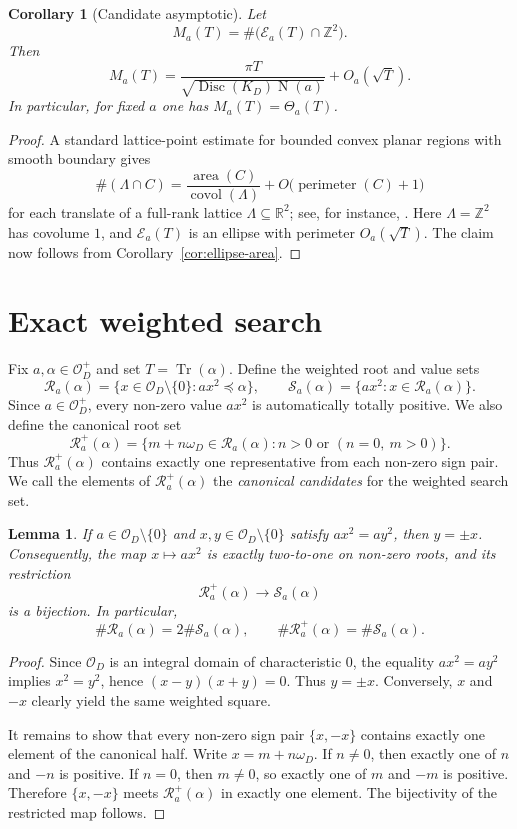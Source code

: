 \documentclass[manuscript]{acmart}
\theoremstyle{plain}
\newtheorem{lemma}[theorem]{Lemma}
\newtheorem{corollary}[theorem]{Corollary}
\theoremstyle{definition}
\theoremstyle{nonitalicremark}
\newcommand{\R}{\mathbb{R}}
\newcommand{\Z}{\mathbb{Z}}
\newcommand{\OO}{\mathcal{O}}
\newcommand{\OD}{\OO_D}
\newcommand{\Tr}{\operatorname{Tr}}
\newcommand{\N}{\operatorname{N}}
\newcommand{\Disc}{\operatorname{Disc}}
\newcommand{\covol}{\operatorname{covol}}
\newcommand{\cE}{\mathcal{E}}
\newcommand{\cR}{\mathcal{R}}
\newcommand{\cS}{\mathcal{S}}
\begin{document}
\begin{corollary}[Candidate asymptotic]\label{cor:candidate-asymptotic}
Let
\[
M_a(T)=\#\bigl(\cE_a(T)\cap\Z^2\bigr).
\]
Then
\[
M_a(T)=\frac{\pi T}{\sqrt{\Disc(K_D)\N(a)}} + O_a(\sqrt T).
\]
In particular, for fixed $a$ one has $M_a(T)=\Theta_a(T)$.
\end{corollary}

\begin{proof}
A standard lattice-point estimate for bounded convex planar regions with smooth boundary gives
\[
\#(\Lambda\cap C)=\frac{\operatorname{area}(C)}{\covol(\Lambda)}+O\bigl(\operatorname{perimeter}(C)+1\bigr)
\]
for each translate of a full-rank lattice $\Lambda\subseteq\R^2$; see, for instance,
\cite[Chapter~2]{GruberLekkerkerker}. Here $\Lambda=\Z^2$ has covolume $1$, and
$\cE_a(T)$ is an ellipse with perimeter $O_a(\sqrt T)$. The claim now follows from
Corollary~\ref{cor:ellipse-area}.
\end{proof}

\section{Exact weighted search}\label{sec:search}

Fix $a,\alpha\in\OD^+$ and set $T=\Tr(\alpha)$. Define the weighted root and value sets
\[
\cR_a(\alpha)=\{x\in\OD\setminus\{0\} : a x^2\preccurlyeq \alpha\},
\qquad
\cS_a(\alpha)=\{a x^2 : x\in\cR_a(\alpha)\}.
\]
Since $a\in\OD^+$, every non-zero value $a x^2$ is automatically totally positive. We also define
the canonical root set
\[
\cR_a^+(\alpha)=\{m+n\omega_D\in\cR_a(\alpha) : n>0\text{ or }(n=0,\ m>0)\}.
\]
Thus $\cR_a^+(\alpha)$ contains exactly one representative from each non-zero sign pair. We call the
elements of $\cR_a^+(\alpha)$ the \emph{canonical candidates} for the weighted search set.

\begin{lemma}\label{lem:two-to-one}
If $a\in\OD\setminus\{0\}$ and $x,y\in\OD\setminus\{0\}$ satisfy $a x^2=a y^2$, then $y=\pm x$.
Consequently, the map $x\mapsto a x^2$ is exactly two-to-one on non-zero roots, and its restriction
\[
\cR_a^+(\alpha)\to\cS_a(\alpha)
\]
is a bijection. In particular,
\[
\#\cR_a(\alpha)=2\#\cS_a(\alpha),
\qquad
\#\cR_a^+(\alpha)=\#\cS_a(\alpha).
\]
\end{lemma}

\begin{proof}
Since $\OD$ is an integral domain of characteristic $0$, the equality $a x^2=a y^2$ implies
$x^2=y^2$, hence $(x-y)(x+y)=0$. Thus $y=\pm x$. Conversely, $x$ and $-x$ clearly yield the same
weighted square.

It remains to show that every non-zero sign pair $\{x,-x\}$ contains exactly one element of the
canonical half. Write $x=m+n\omega_D$. If $n\neq 0$, then exactly one of $n$ and $-n$ is positive.
If $n=0$, then $m\neq 0$, so exactly one of $m$ and $-m$ is positive. Therefore $\{x,-x\}$ meets
$\cR_a^+(\alpha)$ in exactly one element. The bijectivity of the restricted map follows.
\end{proof}
\end{document}
